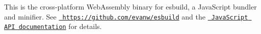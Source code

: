 This is the cross-\/platform Web\+Assembly binary for esbuild, a Java\+Script bundler and minifier. See \href{https://github.com/evanw/esbuild}{\texttt{ https\+://github.\+com/evanw/esbuild}} and the \href{https://esbuild.github.io/api/}{\texttt{ Java\+Script API documentation}} for details. 